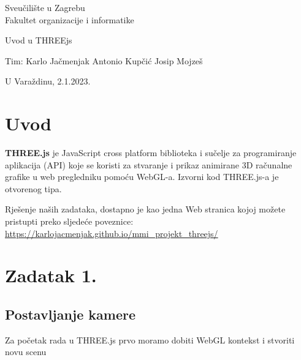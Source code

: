 \documentclass[a4paper,12pt]{article}
\begin{document}
\thispagestyle{empty}
\begin{center}
Sveučilište u Zagrebu\\
Fakultet organizacije i informatike
\end{center}
\vfill
\begin{center}
\Large Uvod u THREEjs
\end{center}
\vfill
\begin{flushright}
Tim: Karlo Jačmenjak \break
Antonio Kupčić \break
Josip Mojzeš \break
\end{flushright}
U Varaždinu, 2.1.2023. 

\newpage
\setcounter{page}{1}

\section*{Uvod}

\textbf{THREE.js} je JavaScript cross platform biblioteka i sučelje za programiranje aplikacija (API) koje se koristi za stvaranje i prikaz animirane 3D računalne grafike u web pregledniku pomoću WebGL-a. Izvorni kod THREE.js-a je otvorenog tipa.


\noindent Rješenje naših zadataka, dostapno je kao jedna Web stranica kojoj možete pristupti preko sljedeće poveznice:
\\\url{https://karlojacmenjak.github.io/mmi_projekt_threejs/}

\section*{Zadatak 1.}
\subsection*{Postavljanje kamere}
\begin{flushleft}
    Za početak rada u THREE.js prvo moramo dobiti WebGL kontekst i stvoriti novu scenu 
\end{flushleft}
\end{document}
